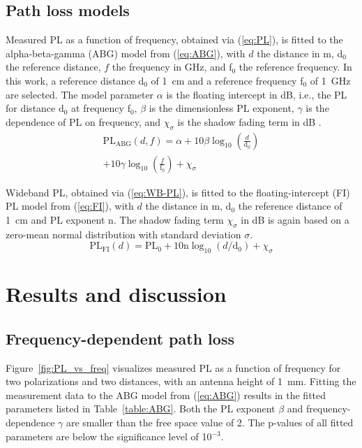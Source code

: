 \documentclass[preprint]{rsl}
\begin{document}
\subsection{Path loss models}

Measured PL as a function of frequency, obtained via (\ref{eq:PL}), is fitted to the alpha-beta-gamma (ABG) model from (\ref{eq:ABG}), with $d$ the distance in m, d$_0$ the reference distance, $f$ the frequency in GHz, and f$_0$ the reference frequency.  
In this work, a reference distance d$_0$ of 1~cm and a reference frequency f$_0$ of 1~GHz are selected.
The model parameter $\alpha$ is the floating intercept in dB, i.e., the PL for distance d$_0$ at frequency f$_0$, $\beta$ is the dimensionless PL exponent, $\gamma$ is the dependence of PL on frequency, and $\chi_{\sigma}$ is the shadow fading term in dB \cite{Salous2020}. 
\begin{multline}
  \text{PL}_{\text{ABG}}(d,f) = \alpha + 10 \beta \log_{10}\left(\frac{d}{\text{d}_0}\right) \\ + 10 \gamma \log_{10}\left(\frac{f}{ \text{f}_0}\right) + \chi_{\sigma}
  \label{eq:ABG}
\end{multline}

Wideband PL, obtained via (\ref{eq:WB-PL}), is fitted to the floating-intercept (FI) PL model from (\ref{eq:FI}), with $d$ the distance in m, d$_0$ the reference distance of 1~cm and PL exponent n. 
The shadow fading term $\chi_\sigma$ in dB is again based on a zero-mean normal distribution with standard deviation $\sigma$. 
\begin{equation}
  \text{PL}_{\text{FI}}(d) = \text{PL}_0 + 10 \text{n} \log_{10} (d/\text{d}_0) + \chi_\sigma
  \label{eq:FI}
\end{equation}

\section{Results and discussion\label{sect:results}}

\subsection{Frequency-dependent path loss}

Figure~\ref{fig:PL_vs_freq} visualizes measured PL as a function of frequency for two polarizations and two distances, with an antenna height of 1~mm.
Fitting the measurement data to the ABG model from (\ref{eq:ABG}) results in the fitted parameters listed in Table~\ref{table:ABG}. 
Both the PL exponent $\beta$ and frequency-dependence $\gamma$ are smaller than the free space value of 2. 
The p-values of all fitted parameters are below the significance level of 10$^{-3}$. 
\end{document}
